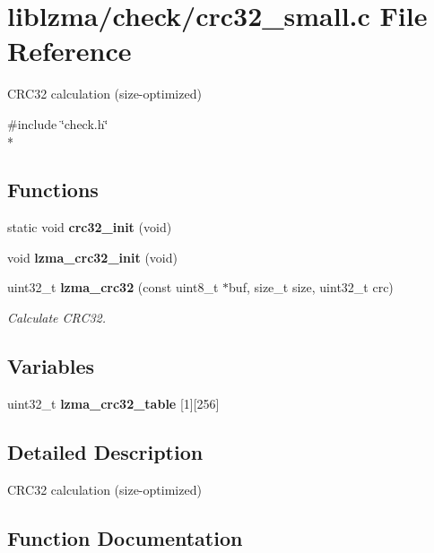 \section{liblzma/check/crc32\-\_\-small.c File Reference}
\label{crc32__small_8c}


C\-R\-C32 calculation (size-\/optimized)  


{\ttfamily \#include \char`\"{}check.\-h\char`\"{}}\\*
\subsection*{Functions}
\begin{DoxyCompactItemize}
\item 
static void {\bfseries crc32\-\_\-init} (void)\label{crc32__small_8c_abe10d610947fad29dc7da8dd5c9102cd}

\item 
void {\bfseries lzma\-\_\-crc32\-\_\-init} (void)\label{crc32__small_8c_a2fe7980f21bc514b3ebf54930b04741a}

\item 
uint32\-\_\-t {\bf lzma\-\_\-crc32} (const uint8\-\_\-t $\ast$buf, size\-\_\-t size, uint32\-\_\-t crc)
\begin{DoxyCompactList}\small\item\em Calculate C\-R\-C32. \end{DoxyCompactList}\end{DoxyCompactItemize}
\subsection*{Variables}
\begin{DoxyCompactItemize}
\item 
uint32\-\_\-t {\bf lzma\-\_\-crc32\-\_\-table} [1][256]
\end{DoxyCompactItemize}


\subsection{Detailed Description}
C\-R\-C32 calculation (size-\/optimized) 

\subsection{Function Documentation}
